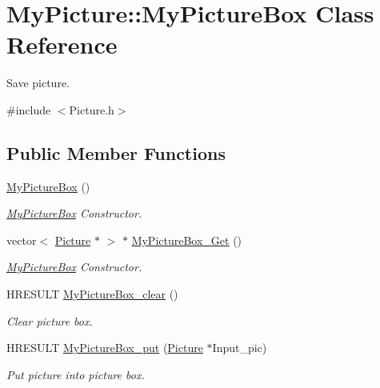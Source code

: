 \hypertarget{class_my_picture_1_1_my_picture_box}{}\section{My\+Picture\+:\+:My\+Picture\+Box Class Reference}
\label{class_my_picture_1_1_my_picture_box}


Save picture.  




{\ttfamily \#include $<$Picture.\+h$>$}

\subsection*{Public Member Functions}
\begin{DoxyCompactItemize}
\item 
\hyperlink{class_my_picture_1_1_my_picture_box_a0ac6ff74b1c28673c810596b0edfdb7e}{My\+Picture\+Box} ()
\begin{DoxyCompactList}\small\item\em \hyperlink{class_my_picture_1_1_my_picture_box}{My\+Picture\+Box} Constructor. \end{DoxyCompactList}\item 
vector$<$ \hyperlink{class_my_picture_1_1_picture}{Picture} $\ast$ $>$ $\ast$ \hyperlink{class_my_picture_1_1_my_picture_box_a7d5ae6ef186cb635d5a2b34670fd36cf}{My\+Picture\+Box\+\_\+\+Get} ()
\begin{DoxyCompactList}\small\item\em \hyperlink{class_my_picture_1_1_my_picture_box}{My\+Picture\+Box} Constructor. \end{DoxyCompactList}\item 
H\+R\+E\+S\+U\+LT \hyperlink{class_my_picture_1_1_my_picture_box_a0c04c2b1c23f67b8cd3628647ec5f487}{My\+Picture\+Box\+\_\+clear} ()
\begin{DoxyCompactList}\small\item\em Clear picture box. \end{DoxyCompactList}\item 
H\+R\+E\+S\+U\+LT \hyperlink{class_my_picture_1_1_my_picture_box_a2b89cd943586dff163a84dbda739c7c8}{My\+Picture\+Box\+\_\+put} (\hyperlink{class_my_picture_1_1_picture}{Picture} $\ast$Input\+\_\+pic)
\begin{DoxyCompactList}\small\item\em Put picture into picture box. \end{DoxyCompactList}\item 

\end{DoxyCompactItemize}
